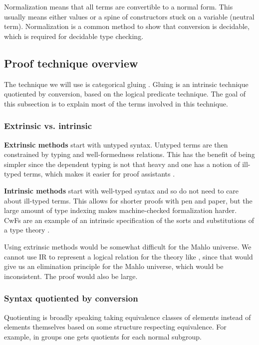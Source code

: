 Normalization means that all terms are convertible to a normal form. This usually means either values or a spine of constructors stuck on a variable (neutral term). Normalization is a common method to show that conversion is decidable, which is required for decidable type checking.

\subsection{Proof technique overview}

The technique we will use is categorical gluing \cite{kaposi2019gluing, artin1973theorie}. Gluing is an intrinsic technique quotiented by conversion, based on the logical predicate technique. The goal of this subsection is to explain most of the terms involved in this technique.

\subsubsection{Extrinsic vs. intrinsic}

\textbf{Extrinsic methods} start with untyped syntax. Untyped terms are then constrained by typing and well-formedness relations. This has the benefit of being simpler since the dependent typing is not that heavy and one has a notion of ill-typed terms, which makes it easier for proof assistants \cite{abel2017decidability, carneiro2024lean4lean, adjedj2024martin}.

\textbf{Intrinsic methods} start with well-typed syntax and so do not need to care about ill-typed terms. This allows for shorter proofs with pen and paper, but the large amount of type indexing makes machine-checked formalization harder. CwFs are an example of an intrinsic specification of the sorts and substitutions of a type theory \cite{dybjer1995internal, danielsson2006formalisation, chapman2009type}.

Using extrinsic methods would be somewhat difficult for the Mahlo universe. We cannot use IR to represent a logical relation for the theory like \cite{abel2017decidability}, since that would give us an elimination principle for the Mahlo universe, which would be inconsistent. The proof would also be large.

\subsubsection{Syntax quotiented by conversion}\label{sec:quo}

Quotienting is broadly speaking taking equivalence classes of elements instead of elements themselves based on some structure respecting equivalence. For example, in groups one gets quotients for each normal subgroup.

